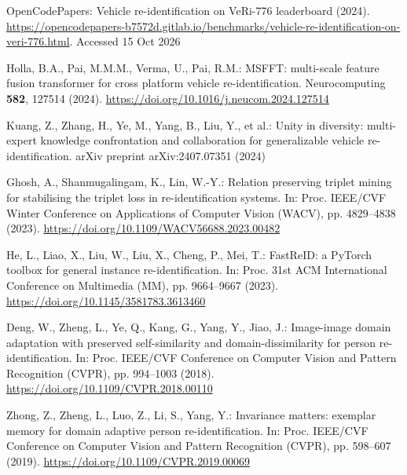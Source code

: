 OpenCodePapers: Vehicle re-identification on VeRi-776 leaderboard (2024).
\url{https://opencodepapers-b7572d.gitlab.io/benchmarks/vehicle-re-identification-on-veri-776.html}.
Accessed 15 Oct 2026

Holla, B.A., Pai, M.M.M., Verma, U., Pai, R.M.: MSFFT: multi-scale feature
fusion transformer for cross platform vehicle re-identification.
Neurocomputing \textbf{582}, 127514 (2024).
\url{https://doi.org/10.1016/j.neucom.2024.127514}

Kuang, Z., Zhang, H., Ye, M., Yang, B., Liu, Y., et al.: Unity in diversity:
multi-expert knowledge confrontation and collaboration for generalizable
vehicle re-identification. arXiv preprint arXiv:2407.07351 (2024)

Ghosh, A., Shanmugalingam, K., Lin, W.-Y.: Relation preserving triplet mining
for stabilising the triplet loss in re-identification systems. In: Proc.
IEEE/CVF Winter Conference on Applications of Computer Vision (WACV),
pp. 4829--4838 (2023). \url{https://doi.org/10.1109/WACV56688.2023.00482}

He, L., Liao, X., Liu, W., Liu, X., Cheng, P., Mei, T.: FastReID: a PyTorch
toolbox for general instance re-identification. In: Proc. 31st ACM
International Conference on Multimedia (MM), pp. 9664--9667 (2023).
\url{https://doi.org/10.1145/3581783.3613460}

Deng, W., Zheng, L., Ye, Q., Kang, G., Yang, Y., Jiao, J.: Image-image domain
adaptation with preserved self-similarity and domain-dissimilarity for person
re-identification. In: Proc. IEEE/CVF Conference on Computer Vision and Pattern
Recognition (CVPR), pp. 994--1003 (2018).
\url{https://doi.org/10.1109/CVPR.2018.00110}

Zhong, Z., Zheng, L., Luo, Z., Li, S., Yang, Y.: Invariance matters: exemplar
memory for domain adaptive person re-identification. In: Proc. IEEE/CVF
Conference on Computer Vision and Pattern Recognition (CVPR), pp. 598--607
(2019). \url{https://doi.org/10.1109/CVPR.2019.00069}

